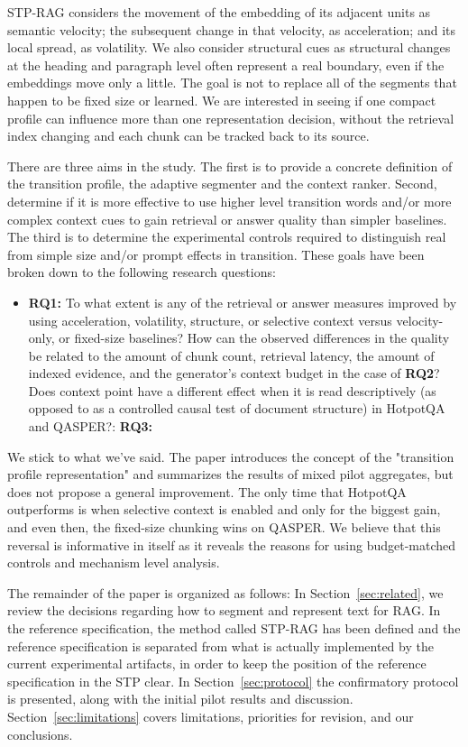 \documentclass[10pt,a4paper]{article}
\begin{document}
STP-RAG considers the movement of the embedding of its adjacent units as semantic velocity; the subsequent change in that velocity, as acceleration; and its local spread, as volatility. We also consider structural cues as structural changes at the heading and paragraph level often represent a real boundary, even if the embeddings move only a little. The goal is not to replace all of the segments that happen to be fixed size or learned. We are interested in seeing if one compact profile can influence more than one representation decision, without the retrieval index changing and each chunk can be tracked back to its source.

There are three aims in the study. The first is to provide a concrete definition of the transition profile, the adaptive segmenter and the context ranker. Second, determine if it is more effective to use higher level transition words and/or more complex context cues to gain retrieval or answer quality than simpler baselines. The third is to determine the experimental controls required to distinguish real from simple size and/or prompt effects in transition. These goals have been broken down to the following research questions:

\begin{itemize}
  \item \textbf{RQ1:} To what extent is any of the retrieval or answer measures improved by using acceleration, volatility, structure, or selective context versus velocity-only, or fixed-size baselines?
  How can the observed differences in the quality be related to the amount of chunk count, retrieval latency, the amount of indexed evidence, and the generator's context budget in the case of \textbf{RQ2}?
  Does context point have a different effect when it is read descriptively (as opposed to as a controlled causal test of document structure) in HotpotQA and QASPER?: \textbf{RQ3:}
\end{itemize}

We stick to what we've said. The paper introduces the concept of the "transition profile representation" and summarizes the results of mixed pilot aggregates, but does not propose a general improvement. The only time that HotpotQA outperforms is when selective context is enabled and only for the biggest gain, and even then, the fixed-size chunking wins on QASPER. We believe that this reversal is informative in itself as it reveals the reasons for using budget-matched controls and mechanism level analysis.

The remainder of the paper is organized as follows: In Section~\ref{sec:related}, we review the decisions regarding how to segment and represent text for RAG. In the reference specification, the method called STP-RAG has been defined and the reference specification is separated from what is actually implemented by the current experimental artifacts, in order to keep the position of the reference specification in the STP clear. In Section~\ref{sec:protocol} the confirmatory protocol is presented, along with the initial pilot results and discussion. Section~\ref{sec:limitations} covers limitations, priorities for revision, and our conclusions.
\end{document}
